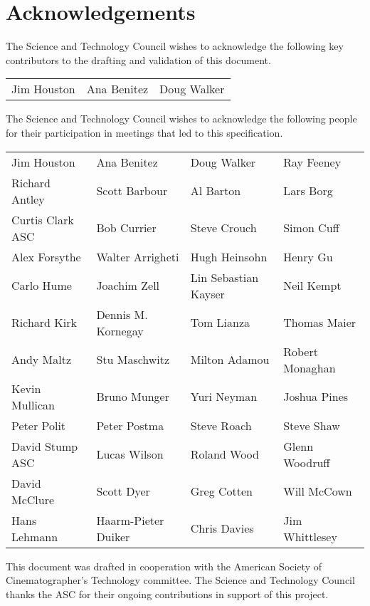 \cleardoublepage
\unnumberedformat	%
\chapter{Acknowledgements} 	%

The Science and Technology Council wishes to acknowledge the following key contributors to the drafting and validation of this document.

\begin{center}
    \begin{tabular}{lll}
        Jim Houston & Ana Benitez & Doug Walker\\
    \end{tabular}
\end{center}

The Science and Technology Council wishes to acknowledge the following people for their participation in meetings that led to this specification.

\begin{center}
    \begin{tabular}{llll}
        Jim Houston & Ana Benitez & Doug Walker & Ray Feeney\\
        Richard Antley & Scott Barbour & Al Barton & Lars Borg \\
        Curtis Clark ASC & Bob Currier & Steve Crouch & Simon Cuff \\
        Alex Forsythe & Walter Arrigheti & Hugh Heinsohn & Henry Gu \\
        Carlo Hume & Joachim Zell & Lin Sebastian Kayser & Neil Kempt\\
        Richard Kirk & Dennis M. Kornegay & Tom Lianza & Thomas Maier\\
        Andy Maltz & Stu Maschwitz & Milton Adamou & Robert Monaghan\\
        Kevin Mullican & Bruno Munger & Yuri Neyman & Joshua Pines\\
        Peter Polit & Peter Postma & Steve Roach & Steve Shaw\\
        David Stump ASC & Lucas Wilson & Roland Wood & Glenn Woodruff\\
        David McClure & Scott Dyer & Greg Cotten & Will McCown\\
        Hans Lehmann & Haarm-Pieter Duiker & Chris Davies & Jim Whittlesey\\
    \end{tabular}
\end{center}

This document was drafted in cooperation with the American Society of Cinematographer's Technology committee. The Science and Technology Council thanks the ASC for their ongoing contributions in support of this project.